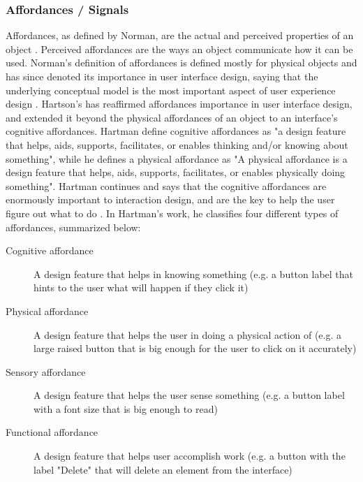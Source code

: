 \subsubsection{Affordances / Signals}
Affordances, as defined by Norman, are the actual and perceived properties of an object \cite{Norman2013a}. Perceived affordances are the ways an object communicate how it can be used. Norman's definition of affordances is defined mostly for physical objects and has since denoted its importance in user interface design, saying that the underlying conceptual model is the most important aspect of user experience design \cite{Norman1999}. Hartson's has reaffirmed affordances importance in user interface design, and extended it beyond the physical affordances of an object to an interface's cognitive affordances. Hartman define cognitive affordances as "a design feature that helps, aids, supports, facilitates, or enables thinking and/or knowing about something", while he defines a physical affordance as "A physical affordance is a design feature that helps, aids, supports, facilitates, or enables physically doing something". Hartman continues and says that the cognitive affordances are enormously important to interaction design, and are the key to help the user figure out what to do \cite{Hartson2003}. In Hartman's work, he classifies four different types of affordances, summarized below:

\begin{description}
  \item[Cognitive affordance] A design feature that helps in knowing something (e.g. a button label that hints to the user what will happen if they click it)
  \item[Physical affordance] A design feature that helps the user in doing a physical action of (e.g. a large raised button that is big enough for the user to click on it accurately)
  \item[Sensory affordance] A design feature that  helps the user sense something (e.g. a button label with a font size that is big enough to read)
  \item[Functional affordance] A design feature that helps user accomplish work (e.g. a button with the label "Delete" that will delete an element from the interface)
\end{description}

